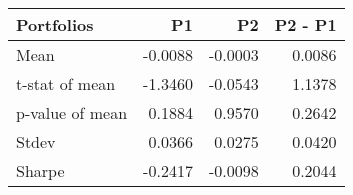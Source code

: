 \begin{tabular}{lrrr}
\toprule
Portfolios & P1 & P2 & P2 - P1 \\
\midrule
Mean & -0.0088 & -0.0003 & 0.0086 \\
t-stat of mean & -1.3460 & -0.0543 & 1.1378 \\
p-value of mean & 0.1884 & 0.9570 & 0.2642 \\
Stdev & 0.0366 & 0.0275 & 0.0420 \\
Sharpe & -0.2417 & -0.0098 & 0.2044 \\
\bottomrule
\end{tabular}
